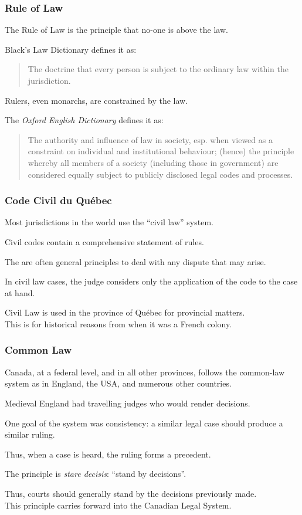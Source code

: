\begin{frame}
\frametitle{Rule of Law}

The \alert{Rule of Law} is the principle that no-one is above the law.

Black's Law Dictionary defines it as:
\begin{quote}
The doctrine that every person is subject to the ordinary law within the jurisdiction.
\end{quote}

Rulers, even monarchs, are constrained by the law. 

The \textit{Oxford English Dictionary} defines it as:

\begin{quote}
The authority and influence of law in society, esp. when viewed as a constraint on individual and institutional behaviour; (hence) the principle whereby all members of a society (including those in government) are considered equally subject to publicly disclosed legal codes and processes.
\end{quote}

\end{frame}



\begin{frame}
\frametitle{Code Civil du Qu\'ebec}

Most jurisdictions in the world use the ``civil law'' system.

Civil codes contain a comprehensive statement of rules. 

The are often general principles to deal with any dispute that may arise.

In civil law cases, the judge considers only the application of the code to the case at hand.

Civil Law is used in the province of Qu\'ebec for provincial matters.\\
\quad This is for historical reasons from when it was a French colony.

\end{frame}



\begin{frame}
\frametitle{Common Law}

Canada, at a federal level, and in all other provinces, follows the common-law system as in England, the USA, and numerous other countries.

Medieval England had travelling judges who would render decisions.

One goal of the system was consistency: a similar legal case should produce a similar ruling.

Thus, when a case is heard, the ruling forms a \alert{precedent}.

The principle is \textit{stare decisis}: ``stand by decisions''.

Thus, courts should generally stand by the decisions previously made.\\
\quad This principle carries forward into the Canadian Legal System.

\end{frame}



